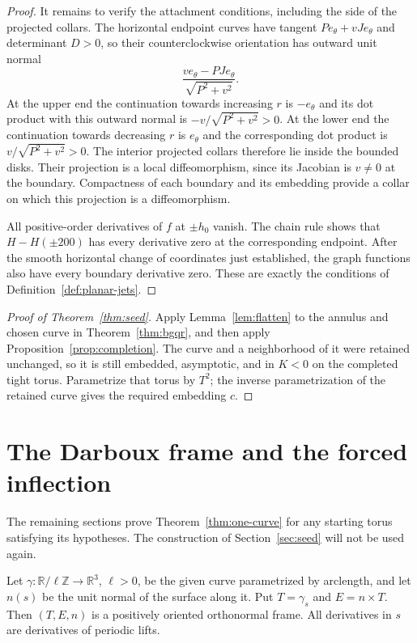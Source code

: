 \documentclass[11pt]{amsart}
\theoremstyle{definition}
\newcommand{\R}{\mathbb R}
\begin{document}
\begin{proof}
It remains to verify the attachment conditions, including the side
of the projected collars. The horizontal endpoint curves have
tangent $Pe_\theta+vJe_\theta$ and determinant $D>0$, so their
counterclockwise orientation has outward unit normal
\[
 \frac{ve_\theta-PJe_\theta}{\sqrt{P^2+v^2}}.
\]
At the upper end the continuation towards increasing $r$ is
$-e_\theta$ and its dot product with this outward normal is
$-v/\sqrt{P^2+v^2}>0$.
At the lower end the continuation towards decreasing $r$ is
$e_\theta$ and the corresponding dot product is
$v/\sqrt{P^2+v^2}>0$.
The interior projected collars therefore lie inside the bounded
disks. Their projection is a local diffeomorphism, since its
Jacobian is $v\ne0$ at the boundary. Compactness of each boundary
and its embedding provide a collar on which this projection is a
diffeomorphism.

All positive-order derivatives of $f$ at $\pm h_0$ vanish.
The chain rule shows that $H-H(\pm200)$ has every derivative
zero at the corresponding endpoint. After the smooth horizontal
change of coordinates just established, the graph functions also
have every boundary derivative zero. These are exactly the
conditions of Definition~\ref{def:planar-jets}.
\end{proof}

\begin{proof}[Proof of Theorem~\ref{thm:seed}]
Apply Lemma~\ref{lem:flatten} to the annulus and chosen curve in
Theorem~\ref{thm:bgqr}, and then apply
Proposition~\ref{prop:completion}. The curve and a neighborhood of
it were retained unchanged, so it is still embedded, asymptotic,
and in $K<0$ on the completed tight torus. Parametrize that torus
by $T^2$; the inverse parametrization of the retained curve gives
the required embedding $c$.
\end{proof}

\section{The Darboux frame and the forced inflection}\label{sec:frame}

The remaining sections prove Theorem~\ref{thm:one-curve} for any
starting torus satisfying its hypotheses. The construction of
Section~\ref{sec:seed} will not be used again.

Let $\gamma:\R/\ell\mathbb Z\to\R^3$, $\ell>0$, be the given curve
parametrized by arclength, and let $n(s)$ be the unit normal of
the surface along it. Put $T=\gamma_s$ and $E=n\times T$.
Then $(T,E,n)$ is a positively oriented orthonormal frame.
All derivatives in $s$ are derivatives of periodic lifts.
\end{document}
